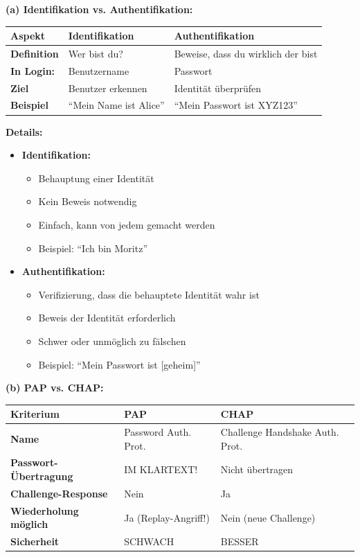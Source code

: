 \documentclass[12pt,a4paper]{article}
\begin{document}
\begin{tcolorbox}[colback=solutionbg, colframe=black!30]

\textbf{(a) Identifikation vs. Authentifikation:} \checkmark

\centering
\begin{tabular}{|l|l|l|}
    \hline
    \textbf{Aspekt} & \textbf{Identifikation} & \textbf{Authentifikation} \\
    \hline
    \textbf{Definition} & Wer bist du? & Beweise, dass du wirklich der bist \\
    \hline
    \textbf{In Login:} & Benutzername & Passwort \\
    \hline
    \textbf{Ziel} & Benutzer erkennen & Identität überprüfen \\
    \hline
    \textbf{Beispiel} & ``Mein Name ist Alice'' & ``Mein Passwort ist XYZ123'' \\
    \hline
\end{tabular}

\textbf{Details:}

\begin{itemize}
    \item \textbf{Identifikation:}
    \begin{itemize}
        \item Behauptung einer Identität
        \item Kein Beweis notwendig
        \item Einfach, kann von jedem gemacht werden
        \item Beispiel: ``Ich bin Moritz''
    \end{itemize}
    
    \item \textbf{Authentifikation:}
    \begin{itemize}
        \item Verifizierung, dass die behauptete Identität wahr ist
        \item Beweis der Identität erforderlich
        \item Schwer oder unmöglich zu fälschen
        \item Beispiel: ``Mein Passwort ist [geheim]''
    \end{itemize}
\end{itemize}

\textbf{(b) PAP vs. CHAP:} \checkmark

\centering
\begin{tabular}{|l|l|l|}
    \hline
    \textbf{Kriterium} & \textbf{PAP} & \textbf{CHAP} \\
    \hline
    \textbf{Name} & Password Auth. Prot. & Challenge Handshake Auth. Prot. \\
    \hline
    \textbf{Passwort-Übertragung} & IM KLARTEXT! & Nicht übertragen \\
    \hline
    \textbf{Challenge-Response} & Nein & Ja \\
    \hline
    \textbf{Wiederholung möglich} & Ja (Replay-Angriff!) & Nein (neue Challenge) \\
    \hline
    \textbf{Sicherheit} & SCHWACH & BESSER \\
    \hline
\end{tabular}

\end{tcolorbox}
\end{document}
